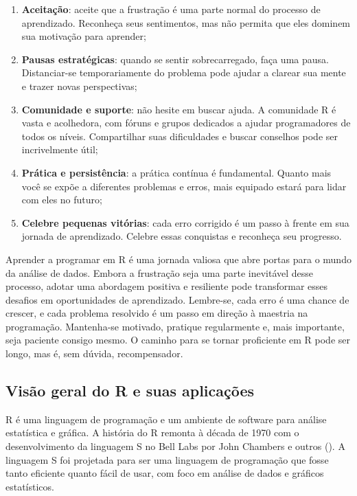 \documentclass[
]{book}
\begin{document}
\begin{enumerate}
\def\labelenumi{\arabic{enumi}.}
\item
  \textbf{Aceitação}: aceite que a frustração é uma parte normal do processo de aprendizado. Reconheça seus sentimentos, mas não permita que eles dominem sua motivação para aprender;
\item
  \textbf{Pausas estratégicas}: quando se sentir sobrecarregado, faça uma pausa. Distanciar-se temporariamente do problema pode ajudar a clarear sua mente e trazer novas perspectivas;
\item
  \textbf{Comunidade e suporte}: não hesite em buscar ajuda. A comunidade R é vasta e acolhedora, com fóruns e grupos dedicados a ajudar programadores de todos os níveis. Compartilhar suas dificuldades e buscar conselhos pode ser incrivelmente útil;
\item
  \textbf{Prática e persistência}: a prática contínua é fundamental. Quanto mais você se expõe a diferentes problemas e erros, mais equipado estará para lidar com eles no futuro;
\item
  \textbf{Celebre pequenas vitórias}: cada erro corrigido é um passo à frente em sua jornada de aprendizado. Celebre essas conquistas e reconheça seu progresso.
\end{enumerate}

Aprender a programar em R é uma jornada valiosa que abre portas para o mundo da análise de dados. Embora a frustração seja uma parte inevitável desse processo, adotar uma abordagem positiva e resiliente pode transformar esses desafios em oportunidades de aprendizado. Lembre-se, cada erro é uma chance de crescer, e cada problema resolvido é um passo em direção à maestria na programação. Mantenha-se motivado, pratique regularmente e, mais importante, seja paciente consigo mesmo. O caminho para se tornar proficiente em R pode ser longo, mas é, sem dúvida, recompensador.

\subsection{Visão geral do R e suas aplicações}\label{visuxe3o-geral-do-r-e-suas-aplicauxe7uxf5es}

R é uma linguagem de programação e um ambiente de software para análise estatística e gráfica. A história do R remonta à década de 1970 com o desenvolvimento da linguagem S no Bell Labs por John Chambers e outros (). A linguagem S foi projetada para ser uma linguagem de programação que fosse tanto eficiente quanto fácil de usar, com foco em análise de dados e gráficos estatísticos.
\end{document}
